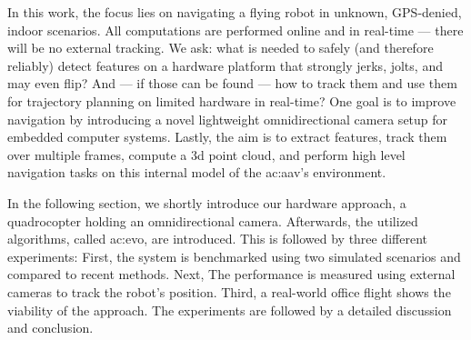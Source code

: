 In this work, the focus lies on navigating a flying robot in unknown, GPS-denied, indoor scenarios.
All computations are performed online and in real-time --- there will be no external tracking.
We ask: what is needed to safely (and therefore reliably) detect features on a hardware platform that strongly jerks, jolts, and may even flip?
And --- if those can be found --- how to track them and use them for trajectory planning on limited hardware in real-time?
One goal is to improve navigation by introducing a novel lightweight omnidirectional camera setup for embedded computer systems.
Lastly, the aim is to extract features, track them over multiple frames, compute a 3d point cloud, and perform high level navigation tasks on this internal model of the \gls{ac:aav}'s environment.

In the following section, we shortly introduce our hardware approach, a quadrocopter holding an omnidirectional camera.
Afterwards, the utilized algorithms, called \gls{ac:evo}, are introduced.
This is followed by three different experiments: First, the system is benchmarked using two simulated scenarios and compared to recent methods.
Next, The performance is measured using external cameras to track the robot's position.
Third, a real-world office flight shows the viability of the approach.
The experiments are followed by a detailed discussion and conclusion.

